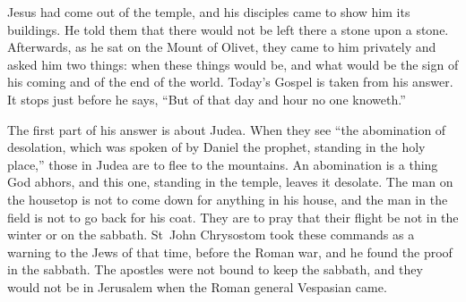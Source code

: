 \raggedcolumns

Jesus had come out of the temple, and his disciples came to show him its
buildings. He told them that there would not be left there a stone upon a
stone. Afterwards, as he sat on the Mount of Olivet, they came to him
privately and asked him two things: when these things would be, and what would
be the sign of his coming and of the end of the world. Today's Gospel is taken
from his answer. It stops just before he says, ``But of that day and hour no
one knoweth.''

The first part of his answer is about Judea. When they see ``the abomination
of desolation, which was spoken of by Daniel the prophet, standing in the holy
place,'' those in Judea are to flee to the mountains. An abomination is a
thing God abhors, and this one, standing in the temple, leaves it desolate.
The man on the housetop is not to come down for anything in his house, and the
man in the field is not to go back for his coat. They are to pray that their
flight be not in the winter or on the sabbath. St~John Chrysostom took these
commands as a warning to the Jews of that time, before the Roman war, and he
found the proof in the sabbath. The apostles were not bound to keep the
sabbath, and they would not be in Jerusalem when the Roman general Vespasian
came.

